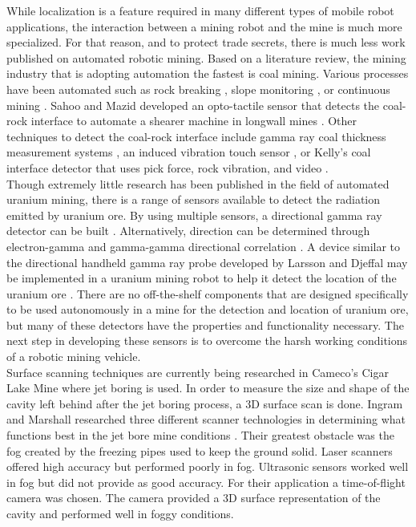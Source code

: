 While localization is a feature required in many different types of mobile robot applications, the interaction between a mining robot and the mine is much more specialized. For that reason, and to protect trade secrets, there is much less work published on automated robotic mining. Based on a literature review, the mining industry that is adopting automation the fastest is coal mining. Various processes have been automated such as rock breaking \cite{breaker}, slope monitoring \cite{slope}, or continuous mining \cite{both}. Sahoo and Mazid developed an opto-tactile sensor that detects the coal-rock interface to automate a shearer machine in longwall mines \cite{opto}. Other techniques to detect the coal-rock interface include gamma ray coal thickness measurement systems \cite{gamma}, an induced vibration touch sensor \cite{vibe}, or Kelly's coal interface detector that uses pick force, rock vibration, and video \cite{kelly}.\\

Though extremely little research has been published in the field of automated uranium mining, there is a range of sensors available to detect the radiation emitted by uranium ore. By using multiple sensors, a directional gamma ray detector can be built \cite{chip}. Alternatively, direction can be determined through electron-gamma and gamma-gamma directional correlation \cite{eggg}. A device similar to the directional handheld gamma ray probe developed by Larsson and Djeffal may be implemented in a uranium mining robot to help it detect the location of the uranium ore \cite{dj}. There are no off-the-shelf components that are designed specifically to be used autonomously in a mine for the detection and location of uranium ore, but many of these detectors have the properties and functionality necessary. The next step in developing these sensors is to overcome the harsh working conditions of a robotic mining vehicle.\\

Surface scanning techniques are currently being researched in Cameco's Cigar Lake Mine where jet boring is used. In order to measure the size and shape of the cavity left behind after the jet boring process, a 3D surface scan is done. Ingram and Marshall researched three different scanner technologies in determining what functions best in the jet bore mine conditions \cite{ingjet}. Their greatest obstacle was the fog created by the freezing pipes used to keep the ground solid. Laser scanners offered high accuracy but performed poorly in fog. Ultrasonic sensors worked well in fog but did not provide as good accuracy. For their application a time-of-flight camera was chosen. The camera provided a 3D surface representation of the cavity and performed well in foggy conditions.\\

